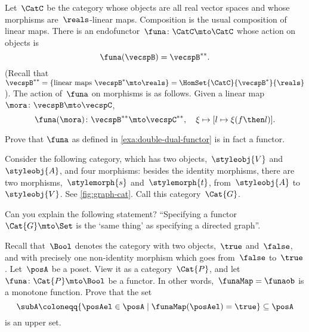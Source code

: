 \begin{example}
    \label{exa:double-dual-functor}
    Let~$\CatC$ be the category whose objects are all real vector spaces and whose morphisms are~$\reals$-linear maps.
    Composition is the usual composition of linear maps.
    There is an endofunctor~$\funa \colon \CatC \mto \CatC$ whose action on objects is
    \begin{equation}
        \funa ( \vecspB ) = \vecspB^{**}.
    \end{equation}
    (Recall that~$\vecspB^{**} = \{ \text{linear maps } \vecspB^* \mto \reals \} =  \HomSet{\CatC}{\vecspB^*}{\reals}$).
    The action of~$\funa$ on morphisms is as follows.
    Given a linear map~$\mora \colon \vecspB \mto \vecspC$,
    \begin{equation}
        \funa ( \mora ) \colon \vecspB^{**} \mto \vecspC^{**}, \quad \xi \mapsto [ l \mapsto \xi (f \then l)].
    \end{equation}
\end{example}

\begin{gradedexercise}
    \label{ex:DoubleDualFunctor}
    Prove that $\funa$ as defined in \cref{exa:double-dual-functor} is in fact a functor.
\end{gradedexercise}

\begin{gradedexercise}
    \label{ex:GraphsViaFunctors}
    Consider the following category, which has two objects,~$\styleobj{V}$ and~$\styleobj{A}$, and four morphisms: besides the identity morphisms, there are two morphisms,~$\stylemorph{s}$ and~$\stylemorph{t}$, from~$\styleobj{A}$ to~$\styleobj{V}$.
    See \cref{fig:graph-cat}.
    Call this category~$\Cat{G}$.

    Can you explain the following statement? ``Specifying a functor~$\Cat{G} \mto \Set$ is the `same thing' as specifying a directed graph''.
\end{gradedexercise}

\begin{marginfigure}
    \centering
    \caption{}
    \label{fig:graph-cat}
\end{marginfigure}

\begin{gradedexercise}
    \label{ex:UpperSetsViaFunctors}
    Recall that~$\Bool$ denotes the category with two objects,~$\true$ and~$\false$, and with precisely one non-identity morphism which goes from~$\false$ to~$\true$.
    Let~$\posA$ be a poset.
    View it as a category~$\Cat{P}$, and let~$\funa \colon \Cat{P} \mto \Bool$ be a functor.
    In other words,~$\funaMap = \funaob$ is a monotone function.
    Prove that the set
    \begin{equation}
        \subA \coloneqq \{ \posAel \in \posA \mid \funaMap(\posAel) = \true \} \subseteq \posA
    \end{equation}
    is an upper set.
\end{gradedexercise}


